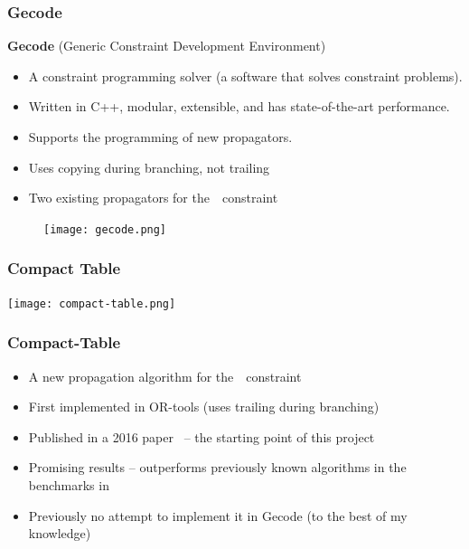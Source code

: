 \documentclass{beamer}
\newcommand{\Table}{\Constraint{Table}}
\newcommand{\CTpaper}[0]{DBLP:conf/cp/DemeulenaereHLP16}
\begin{document}

\begin{frame}

 
  \frametitle{Gecode}
  \textbf{Gecode} (Generic Constraint Development Environment)

  \begin{itemize}
    \item A constraint programming solver (a software that solves constraint problems).
    \item Written in C++, modular, extensible, and has state-of-the-art performance.
    \item Supports the programming of new propagators.
    \item Uses copying during branching, not trailing
    \item   Two existing propagators for the~\Table~constraint
  \end{itemize}

  
    \begin{figure}[t]
    \begin{center}
      \texttt{[image: gecode.png]}
    \end{center}
  \end{figure}


\end{frame}


\begin{frame}
  \frametitle{Compact Table}
  \texttt{[image: compact-table.png]}
\end{frame}

\begin{frame}
  \frametitle{Compact-Table}
  \begin{itemize}
  \item   A new propagation algorithm for the~\Table~constraint
  \item   First implemented in OR-tools (uses trailing during branching)
  \item   Published in a 2016 paper~\cite{\CTpaper} -- the starting
    point of this project
  \item   Promising results -- outperforms previously known algorithms in the
    benchmarks in \cite{\CTpaper}
  \item   Previously no attempt to implement it in Gecode 
    (to the best of my knowledge)
  \end{itemize}

\end{frame}
\end{document}
